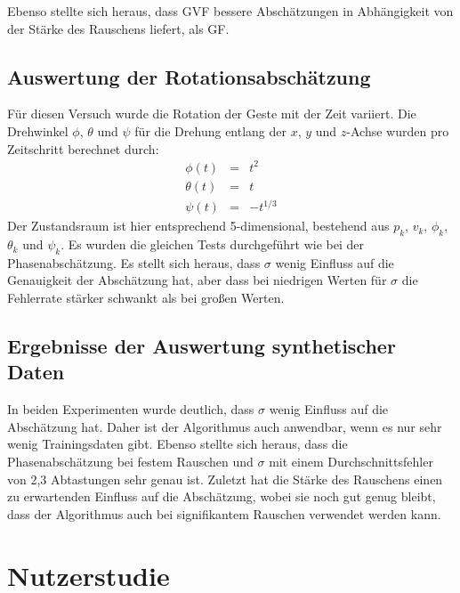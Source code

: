 \documentclass{llncs}
\begin{document}
Ebenso stellte sich heraus, dass GVF bessere Abschätzungen in Abhängigkeit von der Stärke des Rauschens liefert, als GF.

\subsection{Auswertung der Rotationsabschätzung}
Für diesen Versuch wurde die Rotation der Geste mit der Zeit variiert. Die Drehwinkel $\phi$, $\theta$ und $\psi$ für die Drehung entlang der $x$, $y$ und $z$-Achse wurden pro Zeitschritt berechnet durch:
\begin{equation}
\begin{array}{rcl}
\phi(t) & = & t^2\\
\theta(t) & = & t\\
\psi(t) & = & -t^{1/3}
\end{array}
\end{equation}
Der Zustandsraum ist hier entsprechend 5-dimensional, bestehend aus $p_k$, $v_k$, $\phi_k$, $\theta_k$ und $\psi_k$. Es wurden die gleichen Tests durchgeführt wie bei der Phasenabschätzung.
Es stellt sich heraus, dass $\sigma$ wenig Einfluss auf die Genauigkeit der Abschätzung hat, aber dass bei niedrigen Werten für $\sigma$ die Fehlerrate stärker schwankt als bei großen Werten.

\subsection{Ergebnisse der Auswertung synthetischer Daten}
In beiden Experimenten wurde deutlich, dass $\sigma$ wenig Einfluss auf die Abschätzung hat. Daher ist der Algorithmus auch anwendbar, wenn es nur sehr wenig Trainingsdaten gibt. Ebenso stellte sich heraus, dass die Phasenabschätzung bei festem Rauschen und $\sigma$ mit einem Durchschnittsfehler von 2,3 Abtastungen sehr genau ist. Zuletzt hat die Stärke des Rauschens einen zu erwartenden Einfluss auf die Abschätzung, wobei sie noch gut genug bleibt, dass der Algorithmus auch bei signifikantem Rauschen verwendet werden kann.

\section{Nutzerstudie}
\end{document}
